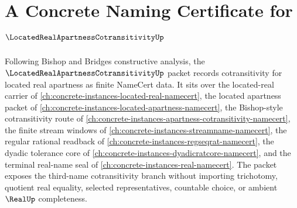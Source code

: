 \chapter{A Concrete Naming Certificate for $\LocatedRealApartnessCotransitivityUp$}
\label{ch:concrete-instances-located-real-apartness-cotransitivity-namecert}

Following Bishop and Bridges constructive analysis, the $\LocatedRealApartnessCotransitivityUp$ packet records cotransitivity for located real apartness as finite NameCert data. It sits over the located-real carrier of \autoref{ch:concrete-instances-located-real-namecert}, the located apartness packet of \autoref{ch:concrete-instances-located-apartness-namecert}, the Bishop-style cotransitivity route of \autoref{ch:concrete-instances-apartness-cotransitivity-namecert}, the finite stream windows of \autoref{ch:concrete-instances-streamname-namecert}, the regular rational readback of \autoref{ch:concrete-instances-regseqrat-namecert}, the dyadic tolerance core of \autoref{ch:concrete-instances-dyadicratcore-namecert}, and the terminal real-name seal of \autoref{ch:concrete-instances-real-namecert}. The packet exposes the third-name cotransitivity branch without importing trichotomy, quotient real equality, selected representatives, countable choice, or ambient $\RealUp$ completeness.

